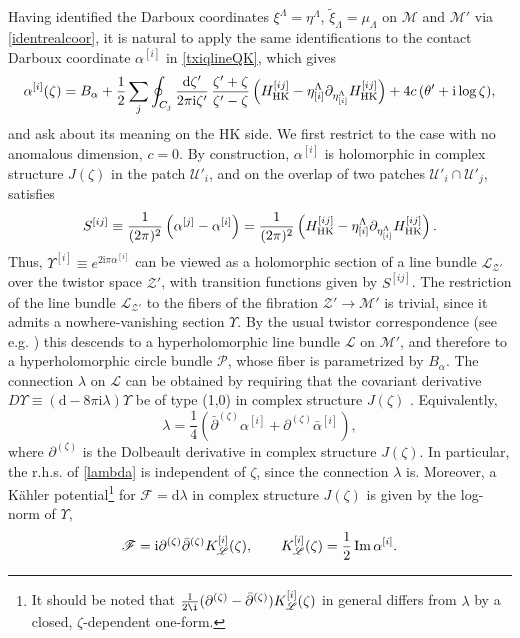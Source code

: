 \documentclass[12pt,reqno]{article}
\numberwithin{equation}{section}
\renewcommand{\Im}{\imag}
\DeclareMathOperator{\imag}{Im}
\newcommand{\be}{\begin{equation}}
\newcommand{\ee}{\end{equation}}
\def\Im{\,{\rm Im}\, }
\def\({\left(}
\def\){\right)}
\def\p{\partial}
\def\hf{\frac{1}{2}}
\newcommand{\de}{\mathrm{d}}
\newcommand{\I}{\mathrm{i}}
\newcommand{\half}{\frac{1}{2}}
\newcommand{\cM}{\mathcal{M}}
\newcommand{\cP}{\mathcal{P}}
\newcommand{\cU}{\mathcal{U}}
\newcommand{\cZ}{\mathcal{Z}}
\newcommand{\fb}{\mathscr{F}}
\newcommand{\lb}{\mathscr{L}}
\def\hHij#1{H^{[#1]}_{\rm HK}}
\def\etai#1{\eta_{[#1]}}
\def\ai#1{{\alpha}^{[#1]}}
\def\ui#1{^{[#1]}}
\newcommand{\txi}{\tilde\xi}
\newcommand{\kahler}{{K\"ahler}\xspace}
\def\varpihk{\zeta}
\def\phip{{\theta'}}
\def\pcM{\cM'}
\def\pcZ{\cZ'}
\def\conhyper{\lambda}
\def\pzeta{\partial^{(\varpihk)}}
\def\bpzeta{\bar\partial^{(\varpihk)}}
\numberwithin{equation}{section}
\begin{document}
Having identified the Darboux coordinates $\xi^\Lambda=\eta^\Lambda$, $\txi_\Lambda=\mu_\Lambda$ on
$\cM$ and $\pcM$ via \eqref{identrealcoor}, it is natural to apply the same identifications to
the contact Darboux coordinate $\ai{i}$ in \eqref{txiqlineQK}, which gives
\be
\ai{i}(\varpihk) =  B_\alpha +
\half  \sum_j \oint_{C_j} \frac{\de \varpihk'}{2 \pi \I \varpihk'} \,
\frac{\varpihk' + \varpihk}{\varpihk' - \varpihk}
\( \hHij{ij}- \etai{i}^\Lambda \p_{\etai{i}^\Lambda}\hHij{ij}\)
+4c\, (\phip + \I \log\varpihk),
\ee
and ask about its meaning on the HK side. We first restrict to the case with no
anomalous dimension, $c=0$. By construction, $\ai{i}$ is holomorphic
 in complex structure $J(\varpihk)$ in the patch $\cU'_i$, and on the
 overlap of two patches $\cU'_i\cap \cU'_j$, satisfies
\be
S\ui{ij} \equiv \frac{1}{(2\pi)^2} \left( \ai{j}-\ai{i} \right)
= \frac{1}{(2\pi)^2} \left( \hHij{ij}- \etai{i}^\Lambda \p_{\etai{i}^\Lambda}\hHij{ij} \right) .
\ee
Thus, $\Upsilon\ui{i}\equiv e^{2\I\pi\ai{i}}$ can be viewed as a holomorphic section
of a line bundle $\lb_{\pcZ}$ over the twistor space $\pcZ$, with transition functions
given by $S\ui{ij}$. The restriction of the line bundle $\lb_{\pcZ}$
to the fibers of the fibration $\pcZ\to \pcM$ is trivial, since it admits a
nowhere-vanishing  section $\Upsilon$. By the usual twistor correspondence
(see e.g. \cite{ward-wells})
this descends to a hyperholomorphic line bundle $\lb$ on $\pcM$, and therefore
to a hyperholomorphic circle bundle $\cP$, whose fiber is parametrized by
$B_\alpha$. The connection
$\lambda$ on $\lb$ can be obtained by requiring that the covariant derivative
$D\Upsilon\equiv (\de -8\pi\I\conhyper)\Upsilon$ be of type (1,0) in complex
structure $J(\varpihk)$ \cite{Gaiotto:2011tf}. Equivalently,
\be
\conhyper = \frac14 \( \bpzeta \ai{i} + \pzeta \bar\alpha\ui{i} \),
\label{lambda}
\ee
where $\pzeta$ is the Dolbeault derivative in complex structure $J(\varpihk)$.
In particular, the r.h.s. of \eqref{lambda} is independent of $\varpihk$,
since the connection $\conhyper$ is.
Moreover, a \kahler potential\footnote{It should be noted that
$\frac{1}{2\i}(\pzeta-\bpzeta)K\ui{i}_{\lb}(\varpihk)$ in general differs from
$\conhyper$ by a closed, $\varpihk$-dependent one-form.}
for $\fb=\de\lambda$
in complex structure $J(\varpihk)$  is given by the log-norm of $\Upsilon$,
\be
\fb=\I\pzeta\bpzeta K\ui{i}_{\lb}(\varpihk),
\qquad
K\ui{i}_{\lb}(\varpihk)= \hf\Im \ai{i}.
\label{Khhgent0}
\ee
\end{document}
